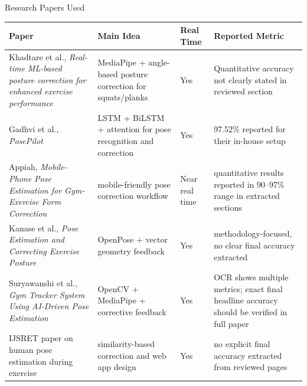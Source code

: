\documentclass[aspectratio=169]{beamer}
\begin{document}
\begin{frame}{Research Papers Used}
\small
\begin{tabular}{p{3.3cm} p{4.4cm} p{2.6cm} p{3.9cm}}
\toprule
\textbf{Paper} & \textbf{Main Idea} & \textbf{Real Time} & \textbf{Reported Metric} \\
\midrule
Khadtare et al., \emph{Real-time ML-based posture correction for enhanced exercise performance} & MediaPipe + angle-based posture correction for squats/planks & Yes & Quantitative accuracy not clearly stated in reviewed section \\
\addlinespace
Gadhvi et al., \emph{PosePilot} & LSTM + BiLSTM + attention for pose recognition and correction & Yes & 97.52\% reported for their in-house setup \\
\addlinespace
Appiah, \emph{Mobile-Phone Pose Estimation for Gym-Exercise Form Correction} & mobile-friendly pose correction workflow & Near real time & quantitative results reported in 90--97\% range in extracted sections \\
\addlinespace
Kanase et al., \emph{Pose Estimation and Correcting Exercise Posture} & OpenPose + vector geometry feedback & Yes & methodology-focused, no clear final accuracy extracted \\
\addlinespace
Suryawanshi et al., \emph{Gym Tracker System Using AI-Driven Pose Estimation} & OpenCV + MediaPipe + corrective feedback & Yes & OCR shows multiple metrics; exact final headline accuracy should be verified in full paper \\
\addlinespace
IJSRET paper on human pose estimation during exercise & similarity-based correction and web app design & Yes & no explicit final accuracy extracted from reviewed pages \\
\bottomrule
\end{tabular}
\end{frame}
\end{document}
